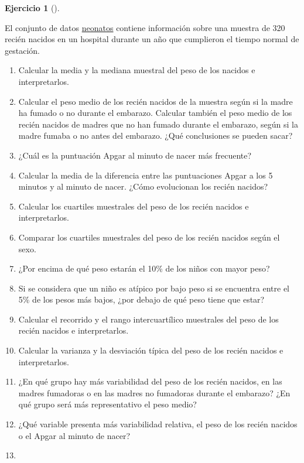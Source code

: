 \documentclass[
  spanish,
  a4paper,
]{scrreport}
\theoremstyle{definition}
\newtheorem{exercise}{Ejercicio}[chapter]
\theoremstyle{remark}
\begin{document}
\begin{exercise}[]\protect\hypertarget{exr-descriptiva-neonatos}{}\label{exr-descriptiva-neonatos}

El conjunto de datos \href{datos/neonatos.csv}{neonatos} contiene
información sobre una muestra de 320 recién nacidos en un hospital
durante un año que cumplieron el tiempo normal de gestación.

\begin{enumerate}
\def\labelenumi{\alph{enumi}.}
\item
  Calcular la media y la mediana muestral del peso de los nacidos e
  interpretarlos.
\item
  Calcular el peso medio de los recién nacidos de la muestra según si la
  madre ha fumado o no durante el embarazo. Calcular también el peso
  medio de los recién nacidos de madres que no han fumado durante el
  embarazo, según si la madre fumaba o no antes del embarazo. ¿Qué
  conclusiones se pueden sacar?
\item
  ¿Cuál es la puntuación Apgar al minuto de nacer más frecuente?
\item
  Calcular la media de la diferencia entre las puntuaciones Apgar a los
  5 minutos y al minuto de nacer. ¿Cómo evolucionan los recién nacidos?
\item
  Calcular los cuartiles muestrales del peso de los recién nacidos e
  interpretarlos.
\item
  Comparar los cuartiles muestrales del peso de los recién nacidos según
  el sexo.
\item
  ¿Por encima de qué peso estarán el 10\% de los niños con mayor peso?
\item
  Si se considera que un niño es atípico por bajo peso si se encuentra
  entre el 5\% de los pesos más bajos, ¿por debajo de qué peso tiene que
  estar?
\item
  Calcular el recorrido y el rango intercuartílico muestrales del peso
  de los recién nacidos e interpretarlos.
\item
  Calcular la varianza y la desviación típica del peso de los recién
  nacidos e interpretarlos.
\item
  ¿En qué grupo hay más variabilidad del peso de los recién nacidos, en
  las madres fumadoras o en las madres no fumadoras durante el embarazo?
  ¿En qué grupo será más representativo el peso medio?
\item
  ¿Qué variable presenta más variabilidad relativa, el peso de los
  recién nacidos o el Apgar al minuto de nacer?
\item

\end{enumerate}
\end{exercise}
\end{document}
